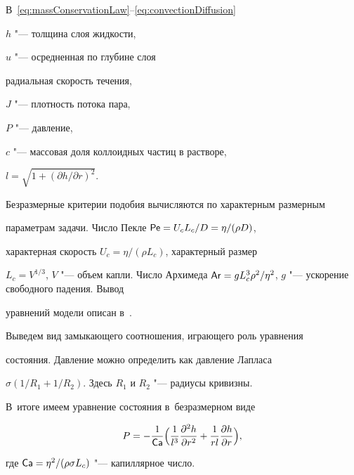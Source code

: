 В~\eqref{eq:massConservationLaw}--\eqref{eq:convectionDiffusion}

$h$ "--- толщина слоя жидкости, 

$u$ "--- осредненная по глубине слоя

радиальная скорость течения, 

$J$ "--- плотность потока пара, 

$P$ "--- давление, 

$c$ "--- массовая доля коллоидных частиц в растворе, 

$l =

\sqrt{1 + ({\partial h}/{\partial r})^2}$.

Безразмерные критерии подобия вычисляются по характерным размерным

параметрам задачи. Число Пекле $\mathop{\mathsf{Pe}} = U_c L_c/D = \eta/(\rho D)$,

характерная скорость $U_c = \eta/(\rho L_c)$, характерный размер

$L_c = V^{1/3}$, $V$ "--- объем капли. Число Архимеда $\Ar = g L_c^3

\rho^2/\eta^2$, $g$ "--- ускорение свободного падения. Вывод

уравнений модели описан в~\cite{KolegovLobanov2012}.



Выведем вид замыкающего соотношения, играющего роль уравнения

состояния. Давление можно определить как давление Лапласа

$\sigma(1/R_1+1/R_2)$. Здесь $R_1$ и $R_2$ "--- радиусы кривизны. 

В~итоге имеем уравнение состояния в~безразмерном виде

\begin{equation}\label{eq:LaplacePressure}

 P =  - \frac{1}{\Ca}\Bigl(\frac{1}{l^3}\frac{\partial^2 h}{\partial r^2} +

 \frac{1}{rl}\frac{\partial h}{\partial r} \Bigr),

\end{equation}

где  $\mathop{\mathsf{Ca}} = \eta^2/(\rho \sigma L_c)$ "--- капиллярное число.





\smallskip




\smallskip



